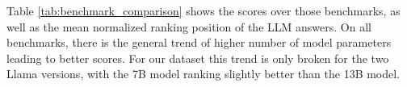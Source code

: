 Table \ref{tab:benchmark_comparison} shows the scores over those benchmarks, as well as the mean normalized ranking position of the LLM answers.
On all benchmarks, there is the general trend of higher number of model parameters leading to better scores.
For our dataset this trend is only broken for the two Llama versions, with the 7B model ranking slightly better than the 13B model.

